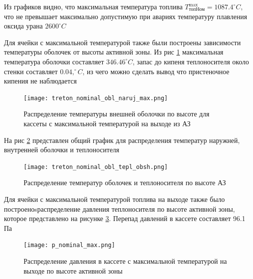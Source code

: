 Из графиков видно, что максимальная температура топлива
$T_{\text{топ} \text{Ном}}^{\max} = 1087.4 ^\circ C$, что не превышает максимально допустимую при авариях температуру плавления оксида урана $2600 ^\circ C$

Для ячейки с максимальной температурой также были построены зависимости температуры оболочек от высоты активной зоны. Из рис \ref{pic:treton-t-obl-naruj-nominal-max} максимальная температура оболочки составляет $346.46 ^\circ C$, запас до кипеня теплоносителя около стенки составляет $0.04, ^\circ C$, из чего можно сделать вывод что пристеночное кипения не наблюдается

\begin{figure}[H]
	\begin{center}
		\texttt{[image: treton\_nominal\_obl\_naruj\_max.png]}
		\caption{Распределение температуры внешней оболочки по высоте для кассеты с максимальной температурой на выходе из АЗ}
		\label{pic:treton-t-obl-naruj-nominal-max} %
	\end{center}
\end{figure}

На рис \ref{pic:treton-obl-tepl-obsh-nominal} представлен  общий график для распределения температур наружней, внутренней оболочки и теплоносителя

\begin{figure}[H]
	\begin{center}
		\texttt{[image: treton\_nominal\_obl\_tepl\_obsh.png]}
		\caption{Распределение температур оболочек и теплоносителя по высоте АЗ}
		\label{pic:treton-obl-tepl-obsh-nominal} %
	\end{center}
\end{figure}

Для ячейки с максимальной температурой топлива на выходе также было построеноsраспределение давления теплоносителя по высоте активной зоны, которое представлено на рисунке \ref{pic:treton-p-nominal-max}. Перепад давлений в кассете составляет 96.1 Па

\begin{figure}[H]
	\begin{center}
		\texttt{[image: p\_nominal\_max.png]}
		\caption{Распределение давления в кассете с максимальной температурой на выходе по высоте активной зоны}
		\label{pic:treton-p-nominal-max} %
	\end{center}
\end{figure}

